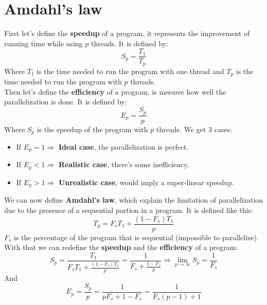 \documentclass[12pt, openany]{report}
\theoremstyle{definition}
\begin{document}
\section{Amdahl's law}
First let's define the \textbf{speedup} of a program, it represents the improvement of running time while using $p$ threads. It is defined by:
\begin{equation}
	S_p = \frac{T_1}{T_p}
\end{equation}
Where $T_1$ is the time needed to run the program with one thread and $T_p$ is the time needed to run the program with $p$ threads.\\
Then let's define the \textbf{efficiency} of a program, is mesures how well the parallelization is done. It is defined by:
\begin{equation}
	E_p = \frac{S_p}{p}
\end{equation}
Where $S_p$ is the speedup of the program with $p$ threads. We get 3 cases:
\begin{itemize}
	\item If $E_p = 1 \Rightarrow$ \textbf{Ideal case}, the parallelization is perfect.
	\item If $E_p < 1 \Rightarrow$ \textbf{Realistic case}, there's some inefficiency.
	\item If $E_p > 1 \Rightarrow$ \textbf{Unrealistic case}, would imply a super-linear speedup.
\end{itemize}
We can now define \textbf{Amdahl's law}, which explain the limitation of parallelization due to the presence of a sequential portion in a program. It is defined like this:
\begin{equation}
	T_p = F_sT_1 + \frac{(1 - F_s)T_1}{p}
\end{equation}
$F_s$ is the percentage of the program that is sequential (impossible to parallelize). With that we can redefine the \textbf{speedup} and the \textbf{efficiency} of a program:
\begin{equation}
	S_p = \frac{T_1}{F_sT_1 + \frac{(1 - F_s)T_1}{p}} = \frac{1}{F_s + \frac{1 - F_s}{p}} \Rightarrow \lim_{p \to \infty} S_p = \frac{1}{F_s}
\end{equation}
And
\begin{equation}
	E_p = \frac{S_p}{p} = \frac{1}{pF_s + 1 - F_s} = \frac{1}{F_s(p - 1) + 1}
\end{equation}
\end{document}
